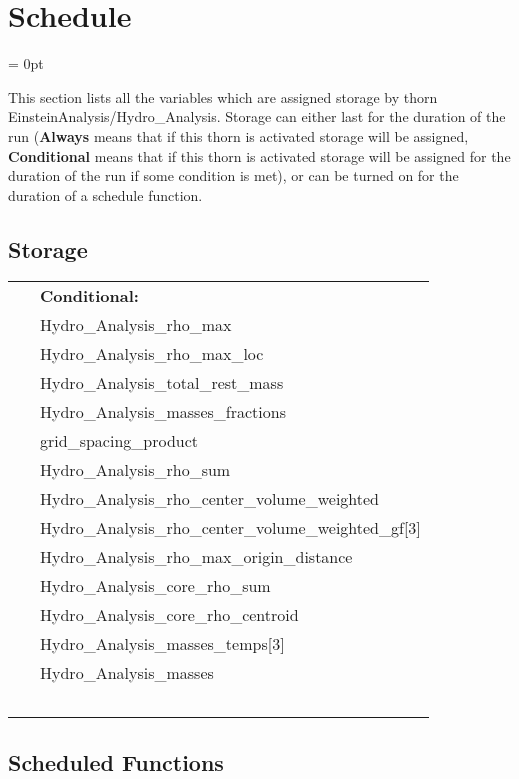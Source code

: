 
\section{Schedule} 


\parskip = 0pt


\noindent This section lists all the variables which are assigned storage by thorn EinsteinAnalysis/Hydro\_Analysis.  Storage can either last for the duration of the run ({\bf Always} means that if this thorn is activated storage will be assigned, {\bf Conditional} means that if this thorn is activated storage will be assigned for the duration of the run if some condition is met), or can be turned on for the duration of a schedule function.


\subsection*{Storage}

\hspace{5mm}

 \begin{tabular*}{160mm}{ll} 
~& {\bf Conditional:} \\ 
~ &  Hydro\_Analysis\_rho\_max\\ 
~ &  Hydro\_Analysis\_rho\_max\_loc\\ 
~ &  Hydro\_Analysis\_total\_rest\_mass\\ 
~ &  Hydro\_Analysis\_masses\_fractions\\ 
~ &  grid\_spacing\_product\\ 
~ &  Hydro\_Analysis\_rho\_sum\\ 
~ &  Hydro\_Analysis\_rho\_center\_volume\_weighted\\ 
~ &  Hydro\_Analysis\_rho\_center\_volume\_weighted\_gf[3]\\ 
~ &  Hydro\_Analysis\_rho\_max\_origin\_distance\\ 
~ &  Hydro\_Analysis\_core\_rho\_sum\\ 
~ &  Hydro\_Analysis\_core\_rho\_centroid\\ 
~ &  Hydro\_Analysis\_masses\_temps[3]\\ 
~ &  Hydro\_Analysis\_masses\\ 
~ & ~\\ 
\end{tabular*} 


\subsection*{Scheduled Functions}
\vspace{5mm}

